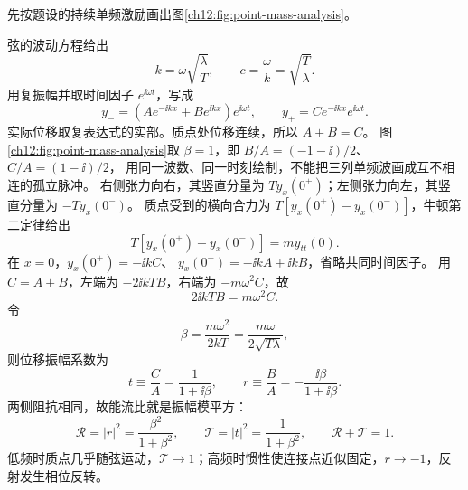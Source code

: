 \begin{xesolution}
先按题设的持续单频激励画出图\ref{ch12:fig:point-mass-analysis}。
\begin{center}\begin{minipage}{\linewidth}\centering
{}
\label{ch12:fig:point-mass-analysis}
\end{minipage}\end{center}

弦的波动方程给出
\[
 \boxed{k=\omega\sqrt{\frac\lambda T}},
 \qquad c=\frac\omega k=\sqrt{\frac T\lambda}.
\]
用复振幅并取时间因子 $e^{\ii\omega t}$，写成
\[
 y_-=(Ae^{-\ii kx}+Be^{\ii kx})e^{\ii\omega t},
 \qquad
 y_+=Ce^{-\ii kx}e^{\ii\omega t}.
\]
实际位移取复表达式的实部。质点处位移连续，所以 $A+B=C$。
图\ref{ch12:fig:point-mass-analysis}取 $\beta=1$，即 $B/A=(-1-\ii)/2$、$C/A=(1-\ii)/2$，
用同一波数、同一时刻绘制，不能把三列单频波画成互不相连的孤立脉冲。
右侧张力向右，其竖直分量为 $Ty_x(0^+)$；左侧张力向左，其竖直分量为 $-Ty_x(0^-)$。
质点受到的横向合力为
$T[y_x(0^+)-y_x(0^-)]$，牛顿第二定律给出
\[
 T[y_x(0^+)-y_x(0^-)]=m y_{tt}(0).
\]
在 $x=0$，$y_x(0^+)=-\ii kC$、
$y_x(0^-)=-\ii kA+\ii kB$，省略共同时间因子。
用 $C=A+B$，左端为 $-2\ii kTB$，右端为 $-m\omega^2C$，故
\[
 2\ii kT B=m\omega^2C.
\]
令
\[
 \beta=\frac{m\omega^2}{2kT}
 =\frac{m\omega}{2\sqrt{T\lambda}},
\]
则位移振幅系数为
\[
 \boxed{t\equiv\frac CA=\frac1{1+\ii\beta}},
 \qquad
 \boxed{r\equiv\frac BA=-\frac{\ii\beta}{1+\ii\beta}}.
\]
两侧阻抗相同，故能流比就是振幅模平方：
\[
 \boxed{\mathcal R=|r|^2=\frac{\beta^2}{1+\beta^2}},
 \qquad
 \boxed{\mathcal T=|t|^2=\frac1{1+\beta^2}},
 \qquad \mathcal R+\mathcal T=1.
\]
低频时质点几乎随弦运动，$\mathcal T\to1$；高频时惯性使连接点近似固定，$r\to-1$，反射发生相位反转。
\end{xesolution}

